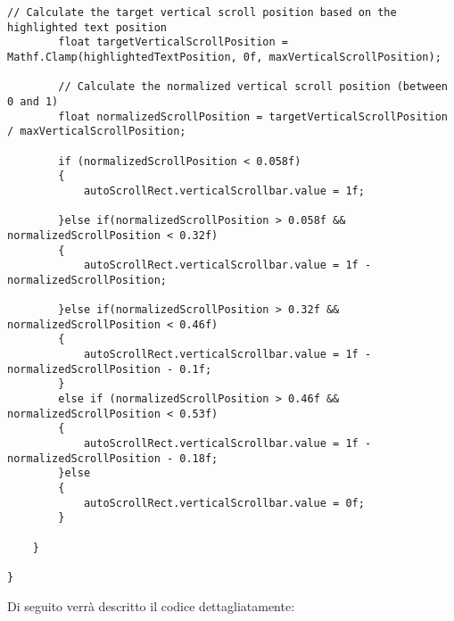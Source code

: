 \begin{lstlisting}[caption=Codice sorgente dello script \textit{ScriptManager}, label=lst:ScriptManagerScript, captionpos=b, basicstyle=\scriptsize]
        // Calculate the target vertical scroll position based on the highlighted text position
        float targetVerticalScrollPosition = Mathf.Clamp(highlightedTextPosition, 0f, maxVerticalScrollPosition);

        // Calculate the normalized vertical scroll position (between 0 and 1)
        float normalizedScrollPosition = targetVerticalScrollPosition / maxVerticalScrollPosition;

        if (normalizedScrollPosition < 0.058f)
        {
            autoScrollRect.verticalScrollbar.value = 1f;
            
        }else if(normalizedScrollPosition > 0.058f && normalizedScrollPosition < 0.32f)
        {
            autoScrollRect.verticalScrollbar.value = 1f - normalizedScrollPosition;
            
        }else if(normalizedScrollPosition > 0.32f && normalizedScrollPosition < 0.46f)
        {
            autoScrollRect.verticalScrollbar.value = 1f - normalizedScrollPosition - 0.1f;
        }
        else if (normalizedScrollPosition > 0.46f && normalizedScrollPosition < 0.53f)
        {
            autoScrollRect.verticalScrollbar.value = 1f - normalizedScrollPosition - 0.18f;
        }else
        {
            autoScrollRect.verticalScrollbar.value = 0f;
        }
        
    }

}

\end{lstlisting}

Di seguito verrà descritto il codice dettagliatamente:

